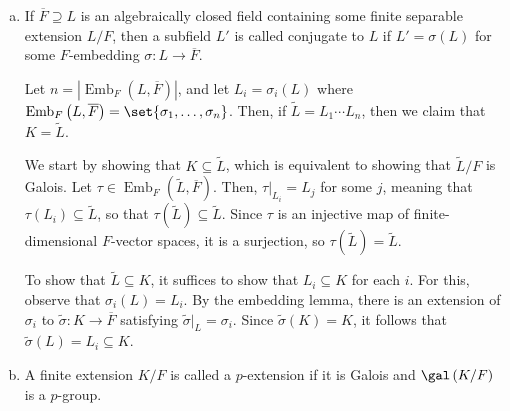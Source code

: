 \documentclass[10pt]{mypackage}
\begin{document}
\begin{solution}\hfill
  \begin{enumerate}[(a)]
    \item If $ \overline{F}\supseteq L$ is an algebraically closed field containing some finite separable extension $L/F$, then a subfield $L'$ is called conjugate to $L$ if $L' = \sigma\left( L \right)$ for some $F$-embedding $\sigma\colon L\rightarrow \overline{F}$.

      Let $n = \left\vert \operatorname{Emb}_F\left( L, \overline{F} \right) \right\vert$, and let $L_i = \sigma_i\left( L \right)$ where $ \operatorname{Emb}_F\left( L, \overline{F} \right) = \set{\sigma_1,\dots,\sigma_n} $. Then, if $\widetilde{L} = L_1\cdots L_n$, then we claim that $K = \widetilde{L}$.

      We start by showing that $K\subseteq \widetilde{L}$, which is equivalent to showing that $ \widetilde{L}/F $ is Galois. Let $\tau\in \operatorname{Emb}_F\left( \widetilde{L}, \overline{F} \right)$. Then, $\tau|_{L_i} = L_j$ for some $j$, meaning that $\tau\left( L_i \right)\subseteq \widetilde{L}$, so that $\tau\left(  \widetilde{L} \right)\subseteq \widetilde{L}$. Since $\tau$ is an injective map of finite-dimensional $F$-vector spaces, it is a surjection, so $\tau\left( \widetilde{L} \right) = \widetilde{L}$. 

      To show that $ \widetilde{L}\subseteq K $, it suffices to show that $L_i\subseteq K$ for each $i$. For this, observe that $\sigma_i\left( L \right) = L_i$. By the embedding lemma, there is an extension of $\sigma_i$ to $ \widetilde{\sigma}\colon K\rightarrow \overline{F} $ satisfying $ \widetilde{\sigma}|_{L} = \sigma_i $. Since $ \widetilde{\sigma}\left( K \right) = K $, it follows that $ \widetilde{\sigma}\left( L \right) = L_i\subseteq K $.
    \item A finite extension $K/F$ is called a $p$-extension if it is Galois and $\gal\left( K/F \right)$ is a $p$-group.


\end{enumerate}
\end{solution}
\end{document}
